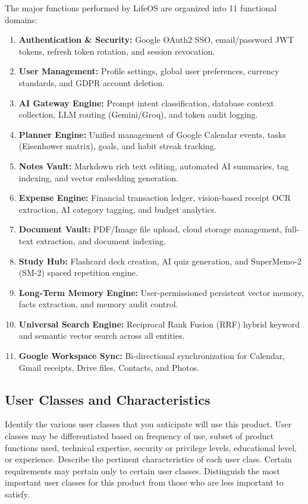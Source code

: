 \documentclass[11pt,a4paper]{article}
\begin{document}
The major functions performed by LifeOS are organized into 11 functional domains:
\begin{enumerate}
    \item \textbf{Authentication \& Security:} Google OAuth2 SSO, email/password JWT tokens, refresh token rotation, and session revocation.
    \item \textbf{User Management:} Profile settings, global user preferences, currency standards, and GDPR account deletion.
    \item \textbf{AI Gateway Engine:} Prompt intent classification, database context collection, LLM routing (Gemini/Groq), and token audit logging.
    \item \textbf{Planner Engine:} Unified management of Google Calendar events, tasks (Eisenhower matrix), goals, and habit streak tracking.
    \item \textbf{Notes Vault:} Markdown rich text editing, automated AI summaries, tag indexing, and vector embedding generation.
    \item \textbf{Expense Engine:} Financial transaction ledger, vision-based receipt OCR extraction, AI category tagging, and budget analytics.
    \item \textbf{Document Vault:} PDF/Image file upload, cloud storage management, full-text extraction, and document indexing.
    \item \textbf{Study Hub:} Flashcard deck creation, AI quiz generation, and SuperMemo-2 (SM-2) spaced repetition engine.
    \item \textbf{Long-Term Memory Engine:} User-permissioned persistent vector memory, facts extraction, and memory audit control.
    \item \textbf{Universal Search Engine:} Reciprocal Rank Fusion (RRF) hybrid keyword and semantic vector search across all entities.
    \item \textbf{Google Workspace Sync:} Bi-directional synchronization for Calendar, Gmail receipts, Drive files, Contacts, and Photos.
\end{enumerate}

\subsection{User Classes and Characteristics}
Identify the various user classes that you anticipate will use this product. User classes may be differentiated based on frequency of use, subset of product functions used, technical expertise, security or privilege levels, educational level, or experience. Describe the pertinent characteristics of each user class. Certain requirements may pertain only to certain user classes. Distinguish the most important user classes for this product from those who are less important to satisfy.
\end{document}

